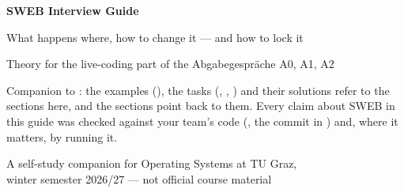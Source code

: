 \documentclass[11pt]{report}
\begin{document}
\begin{titlepage}
  \centering
  \vspace*{3cm}
  {\Huge\bfseries SWEB Interview Guide\par}
  \vspace{0.6cm}
  {\Large What happens where, how to change it --- and how to lock it\par}
  \vspace{2cm}
  {\large Theory for the live-coding part of the Abgabegespräche A0, A1, A2\par}
  \vfill
  \begin{infobox}
  Companion to : the examples (), the tasks
  (, , ) and their solutions refer to the sections here, and
  the sections point back to them. Every claim about SWEB in this guide was checked against
  your team's code (, the commit in ) and, where it matters, by running it.
  \end{infobox}
  \vspace{1cm}
  {\small A self-study companion for Operating Systems at TU Graz,\\ winter semester 2026/27 --- not official course material\par}
\end{titlepage}

\tableofcontents









\end{document}
